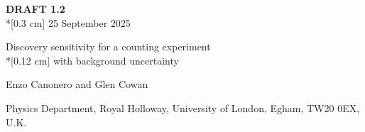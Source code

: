 \documentclass[11pt]{article}
\begin{document}
\begin{flushleft}
\hspace{11 cm} {\bf DRAFT 1.2} \\*[0.3 cm]
\hspace{11 cm} 25 September 2025 \\
\end{flushleft}

\vspace{0.5 cm}

\begin{center}
{\Large Discovery sensitivity for a counting experiment \\*[0.12 cm]
with background uncertainty}
\end{center}

\vspace{3 cm}

\begin{center}
Enzo Canonero and Glen Cowan      %
\end{center}

\vspace{0.5 cm}

\begin{center}
Physics Department, Royal Holloway, University of London, 
Egham, TW20 0EX, U.K. 
\end{center}

\vspace{3 cm}

\begin{abstract}
  An approximate expression is derived for the expected discovery
  significance for a Poisson counting experiment in which the
  background rate is constrained by a Poisson control measurement.
  The formula is based on a test statistic using the profile
  likelihood ratio and the expected significance is approximated by
  using the Asimov data set, as outlined in Ref.~\cite{asimov}.  The
  validity of the new expression is compared with Monte Carlo results
  and to the other formulae for expected significance often used in
  particle physics.  Higher-order asymptotic corrections to both the
  $p$-value and the Asimov approximation are also investigated using
  the Barndorff-Nielsen--Lugannani--Rice $r^*$ statistic, and are
  found to provide improvements at small event yields.
\end{abstract}
\end{document}
